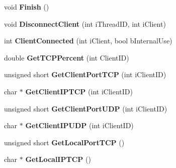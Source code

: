 \begin{DoxyCompactItemize}
\item 
\hypertarget{classcl_instance_a62380e8c956dcfe5c6e7ccfa0894bd83}{
void {\bfseries Finish} ()}
\label{classcl_instance_a62380e8c956dcfe5c6e7ccfa0894bd83}

\item 
\hypertarget{classcl_instance_a46d3a8064bc52e081eeaeb1b2cf96bd8}{
void {\bfseries DisconnectClient} (int iThreadID, int iClient)}
\label{classcl_instance_a46d3a8064bc52e081eeaeb1b2cf96bd8}

\item 
\hypertarget{classcl_instance_a8922886dfa6fc10b7e53651280c073ae}{
int {\bfseries ClientConnected} (int iClient, bool bInternalUse)}
\label{classcl_instance_a8922886dfa6fc10b7e53651280c073ae}

\item 
\hypertarget{classcl_instance_a79e565311fa22e05b380128562b30f96}{
double {\bfseries GetTCPPercent} (int ClientID)}
\label{classcl_instance_a79e565311fa22e05b380128562b30f96}

\item 
\hypertarget{classcl_instance_af9fe228c52cac3a611aa32963d155546}{
unsigned short {\bfseries GetClientPortTCP} (int iClientID)}
\label{classcl_instance_af9fe228c52cac3a611aa32963d155546}

\item 
\hypertarget{classcl_instance_a4c56902b7b32c495b46850bf0733949b}{
char $\ast$ {\bfseries GetClientIPTCP} (int iClientID)}
\label{classcl_instance_a4c56902b7b32c495b46850bf0733949b}

\item 
\hypertarget{classcl_instance_ac0e6a1b21d643f554cec394d9a193723}{
unsigned short {\bfseries GetClientPortUDP} (int iClientID)}
\label{classcl_instance_ac0e6a1b21d643f554cec394d9a193723}

\item 
\hypertarget{classcl_instance_a705c0add96195253625e23c2cd6bbdbc}{
char $\ast$ {\bfseries GetClientIPUDP} (int iClientID)}
\label{classcl_instance_a705c0add96195253625e23c2cd6bbdbc}

\item 
\hypertarget{classcl_instance_a5d376a4f04909abc5ce4989a6ff63523}{
unsigned short {\bfseries GetLocalPortTCP} ()}
\label{classcl_instance_a5d376a4f04909abc5ce4989a6ff63523}

\item 
\hypertarget{classcl_instance_add81d69bb6860d4ee118793f06a7236b}{
char $\ast$ {\bfseries GetLocalIPTCP} ()}
\label{classcl_instance_add81d69bb6860d4ee118793f06a7236b}


\end{DoxyCompactItemize}
